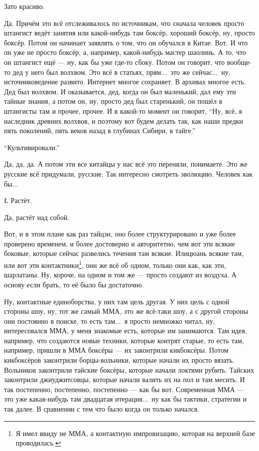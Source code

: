 \N
Зато красиво.

\A
Да. Причём это всё отслеживалось по источникам,
что сначала человек просто штангист
ведёт занятия
или какой-нибудь там боксёр,
хороший боксёр, ну, просто боксёр.
Потом он
начинает заявлять о том, что он
обучался в Китае.
Вот. И что он
уже не просто боксёр, а, например,
какой-нибудь мастер шаолинь.
А то, что он штангист
ещё --- ну, как бы
уже где-то сбоку.
Потом он говорит, что вообще-то
дед у него был
волхвом. Это всё
в статьях, прям...\ это же сейчас...\
ну, источниковедение
развито. Интернет многое сохраняет.
В архивах многое есть.
Дед был волхвом.
И оказывается, дед, когда он был
маленький, дал ему
эти тайные знания, а потом
он, ну, просто дед был старенький,
он пошёл в штангисты там и прочее,
прочее. И в какой-то
момент он говорит, ``Ну, всё, я наследник древних
волхвов, и поэтому
вот будем делать так, как
наши предки пять
поколений, пять веков назад
в глубинах Сибири,
в тайге.''

\N
``Культивировали.''

\A
Да, да, да.
А потом эти все китайцы у нас всё это
переняли, понимаете. Это же русские
всё придумали, русские.
Так интересно смотреть эволюцию.
Человек
как бы...

\L
Растёт.

\A
Да, растёт над собой.

\I
Вот, и в этом плане как раз
тайцзи, оно более
структурировано и уже более проверено
временем, и более
достоверно и авторитетно,
чем вот эти всякие боковые, которые
сейчас развелись течения там всякие.
Илицюань
всякие там, или вот эти
контактники\footnote*{Я имел ввиду не ММА, а контактную импровизацию,
которая на верхней базе проводилась.}, они же всё об одном, только
они как, как эти,
шарлатаны. Ну, короче,
на одном и том же --- просто
создают из воздуха.
А основу если брать,
то её было бы достаточно.

\A
Ну,
контактные единоборства,
у них там
цель другая. У них цель
с одной стороны шоу,
ну, тот же самый ММА,
это же всё-таки шоу,
а с другой стороны они
постоянно в поиске,
то есть там...\ я просто
немножко читал, ну,
интересовался ММА,
у меня знакомые есть, которые им занимаются.
Там идея, например, что
создаются новые техники,
которые контрят старые,
то есть там, например,
пришли в ММА боксёры ---
их законтрили
кикбоксёры. Потом
кикбоксёров законтрили
борцы-вольники,
которые начали их просто вязать.
Вольников законтрили тайские
боксёры, которые начали локтями
рубить. Тайских законтрили
джиуджитсовцы,
которые начали
валить их на пол и там месить.
И так постепенно, постепенно, постепенно ---
как бы вот.
Современная ММА ---
это уже какая-нибудь
там двадцатая итерация...\
ну как бы тактики,
стратегии и так далее.
В сравнении с тем что было
когда он только начался.

